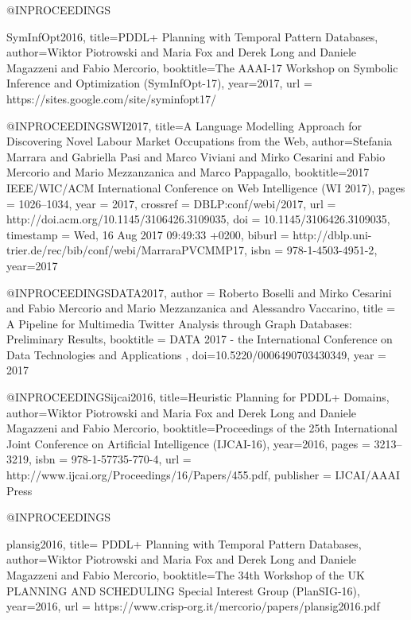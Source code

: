 {{@INPROCEEDINGS{SymInfOpt2016,
  title={PDDL+ Planning with Temporal Pattern Databases},
  author={Wiktor Piotrowski and Maria Fox and Derek Long and Daniele Magazzeni and Fabio Mercorio},
  booktitle={The AAAI-17 Workshop on Symbolic Inference and Optimization  (SymInfOpt-17)},
  year={2017},
url = {https://sites.google.com/site/syminfopt17/}

}


@INPROCEEDINGS{WI2017,
  title={A Language Modelling Approach for Discovering Novel Labour Market Occupations from the Web},
  author={Stefania Marrara and
               Gabriella Pasi and
               Marco Viviani and
               Mirko Cesarini and
               Fabio Mercorio and
               Mario Mezzanzanica and
               Marco Pappagallo},
  booktitle={2017 IEEE/WIC/ACM International Conference on Web Intelligence (WI 2017)},
 pages     = {1026--1034},
  year      = {2017},
  crossref  = {DBLP:conf/webi/2017},
  url       = {http://doi.acm.org/10.1145/3106426.3109035},
  doi       = {10.1145/3106426.3109035},
  timestamp = {Wed, 16 Aug 2017 09:49:33 +0200},
  biburl    = {http://dblp.uni-trier.de/rec/bib/conf/webi/MarraraPVCMMP17},
isbn      = {978-1-4503-4951-2},  
year={2017}
}



@INPROCEEDINGS{DATA2017,
  author = {Roberto Boselli and Mirko Cesarini and Fabio Mercorio and Mario Mezzanzanica and Alessandro Vaccarino},
  title = {A Pipeline for Multimedia Twitter Analysis through Graph Databases: Preliminary Results},
  booktitle = {DATA 2017 -  the International Conference on Data Technologies and Applications },
doi={10.5220/0006490703430349},
  year = {2017}
  }


@INPROCEEDINGS{ijcai2016,
  title={Heuristic Planning for {PDDL}+ Domains},
  author={Wiktor Piotrowski and Maria Fox and Derek Long and Daniele Magazzeni and Fabio Mercorio},
  booktitle={Proceedings of the 25th International Joint Conference on Artificial Intelligence (IJCAI-16)},
  year={2016},
  pages = {3213--3219},
isbn      = {978-1-57735-770-4},
url       = {http://www.ijcai.org/Proceedings/16/Papers/455.pdf},
publisher = {IJCAI/AAAI Press}
}



@INPROCEEDINGS{plansig2016,
  title={ {PDDL}+ Planning with Temporal Pattern Databases},
  author={Wiktor Piotrowski and Maria Fox and Derek Long and Daniele Magazzeni and Fabio Mercorio},
  booktitle={The 34th Workshop of the UK PLANNING AND SCHEDULING Special Interest Group  (PlanSIG-16)},
  year={2016},
url = {https://www.crisp-org.it/mercorio/papers/plansig2016.pdf}

}}}
